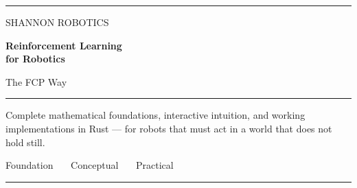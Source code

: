 \documentclass[11pt, twoside, openright]{book}
\begin{document}
\frontmatter
\pagestyle{empty}

\begin{titlepage}
\thispagestyle{empty}
\noindent
{\color{shTeal}\rule{\textwidth}{3pt}}
\vspace{2.2in}

\noindent
{\displayfont\fontsize{10}{12}\selectfont\color{shTealDark}%
 \MakeUppercase{Shannon Robotics}}

\vspace{10pt}
\noindent
{\displayfont\bfseries\fontsize{34}{39}\selectfont\color{shInk}%
 Reinforcement Learning\\for Robotics}

\vspace{12pt}
\noindent
{\displayfont\fontsize{16}{20}\selectfont\color{shInkMuted}%
 The FCP Way}

\vspace{20pt}
\noindent
{\color{shSlate300}\rule{2.4in}{0.6pt}}

\vspace{16pt}
\noindent
\begin{minipage}{4.2in}
{\fontsize{11}{15}\selectfont\color{shInkSecondary}%
 Complete mathematical foundations, interactive intuition, and working
 implementations in Rust --- for robots that must act in a world that does not
 hold still.}
\end{minipage}

\vfill
\noindent
{\displayfont\fontsize{9}{12}\selectfont\color{shInkMuted}%
 Foundation \ \textperiodcentered\ \ Conceptual \ \textperiodcentered\ \ Practical}

\vspace{6pt}
\noindent
{\color{shTeal}\rule{\textwidth}{3pt}}
\end{titlepage}
\end{document}
